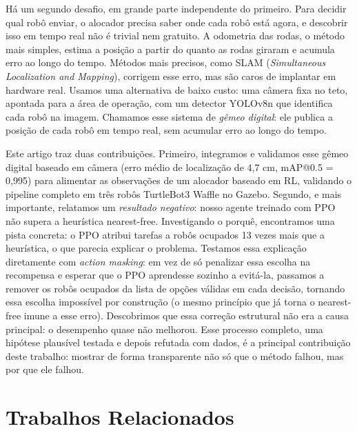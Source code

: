 \documentclass[conference]{IEEEtran}
\begin{document}
Há um segundo desafio, em grande parte independente do primeiro. Para decidir qual robô enviar, o alocador precisa saber onde cada robô está agora, e descobrir isso em tempo real não é trivial nem gratuito. A odometria das rodas, o método mais simples, estima a posição a partir do quanto as rodas giraram e acumula erro ao longo do tempo. Métodos mais precisos, como SLAM (\textit{Simultaneous Localization and Mapping}), corrigem esse erro, mas são caros de implantar em hardware real. Usamos uma alternativa de baixo custo: uma câmera fixa no teto, apontada para a área de operação, com um detector YOLOv8n que identifica cada robô na imagem. Chamamos esse sistema de \emph{gêmeo digital}: ele publica a posição de cada robô em tempo real, sem acumular erro ao longo do tempo.

Este artigo traz duas contribuições. Primeiro, integramos e validamos esse gêmeo digital baseado em câmera (erro médio de localização de 4,7 cm, mAP@0.5 = 0,995) para alimentar as observações de um alocador baseado em RL, validando o pipeline completo em três robôs TurtleBot3 Waffle no Gazebo. Segundo, e mais importante, relatamos um \emph{resultado negativo}: nosso agente treinado com PPO não supera a heurística nearest-free. Investigando o porquê, encontramos uma pista concreta: o PPO atribui tarefas a robôs ocupados 13 vezes mais que a heurística, o que parecia explicar o problema. Testamos essa explicação diretamente com \textit{action masking}: em vez de só penalizar essa escolha na recompensa e esperar que o PPO aprendesse sozinho a evitá-la, passamos a remover os robôs ocupados da lista de opções válidas em cada decisão, tornando essa escolha impossível por construção (o mesmo princípio que já torna o nearest-free imune a esse erro). Descobrimos que essa correção estrutural não era a causa principal: o desempenho quase não melhorou. Esse processo completo, uma hipótese plausível testada e depois refutada com dados, é a principal contribuição deste trabalho: mostrar de forma transparente não só que o método falhou, mas por que ele falhou.

\section{Trabalhos Relacionados}
\end{document}

